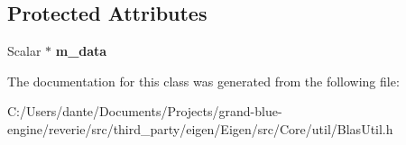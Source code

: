 \subsection*{Protected Attributes}
\begin{DoxyCompactItemize}
\item 
\mbox{\label{class_eigen_1_1internal_1_1_blas_vector_mapper_a0404fe18b0e65c578304bc477bf46e6c}} 
Scalar $\ast$ {\bfseries m\+\_\+data}
\end{DoxyCompactItemize}


The documentation for this class was generated from the following file\+:\begin{DoxyCompactItemize}
\item 
C\+:/\+Users/dante/\+Documents/\+Projects/grand-\/blue-\/engine/reverie/src/third\+\_\+party/eigen/\+Eigen/src/\+Core/util/Blas\+Util.\+h\end{DoxyCompactItemize}
